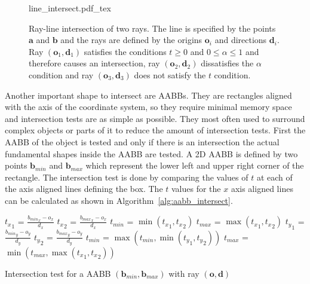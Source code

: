 \documentclass[a4paper,10pt]{article}
\renewcommand{\vec}[1]{\mathbf{#1}}
\newcommand{\algref}[1]{Algorithm~\ref{#1}}
\begin{document}
    \begin{center}
        \begin{figure}
            \centering    
            \def\svgwidth{0.8\textwidth}
            {line_intersect.pdf_tex}
            \caption[Ray-line intersection]{
                Ray-line intersection of two rays. The line is specified by
                the points $\vec{a}$ and $\vec{b}$ and the rays are 
                defined by
                the origins $\vec{o}_i$ and directions $\vec{d}_i$.
                Ray $(\vec{o}_1, \vec{d}_1)$ satisfies the conditions 
                $t \geq 0$ and $0 \leq \alpha \leq 1$
                and therefore causes an intersection, ray $(\vec{o}_2, \vec{d}_2)$
                dissatisfies the $\alpha$ condition and ray $(\vec{o}_3, \vec{d}_3)$
                does not satisfy the $t$ condition. 
            }
            \label{fig:line_intersect}
        \end{figure}
    \end{center}

    Another important shape to intersect are AABBs.
    They are rectangles aligned with the axis of the coordinate system,
    so they require minimal memory space and intersection tests are
    as simple as possible.
    They most often used to surround complex objects or parts of it
    to reduce the amount of intersection tests.
    First the AABB of the object is tested and only if there is an
    intersection the actual fundamental shapes inside the AABB are tested.
    A 2D AABB is defined by two points $\vec{b}_{min}$ and $\vec{b}_{max}$ which
    represent the lower left and upper right corner of the rectangle.
    The intersection test is done by comparing the values of $t$ at each
    of the axis aligned lines defining the box.
    The $t$ values for the $x$ axis aligned lines can be calculated as
    shown in \algref{alg:aabb_intersect}.

    \begin{algorithm}
        \label{alg:aabb_intersect}
        \SetAlgoLined

        ${t_x}_1$ = $\frac{{b_{min}}_x - o_x}{d_x}$\;
        ${t_x}_2$ = $\frac{{b_{max}}_x - o_x}{d_x}$\;
        $t_{min}$ = $\min({t_x}_1, {t_x}_2)$\;
        $t_{max}$ = $\max({t_x}_1, {t_x}_2)$\;
        ${t_y}_1$ = $\frac{{b_{min}}_y - o_y}{d_y}$\;
        ${t_y}_2$ = $\frac{{b_{max}}_y - o_y}{d_y}$\;
        $t_{min}$ = $\max(t_{min}, \min({t_y}_1, {t_y}_2))$\;
        $t_{max}$ = $\min(t_{max}, \max({t_x}_1, {t_x}_2))$\;

        \caption[Intersection test for a AABB]{
        Intersection test for a AABB $(\vec{b}_{min}, \vec{b}_{max})$
        with ray $(\vec{o}, \vec{d})$
        }
    \end{algorithm}
\end{document}
